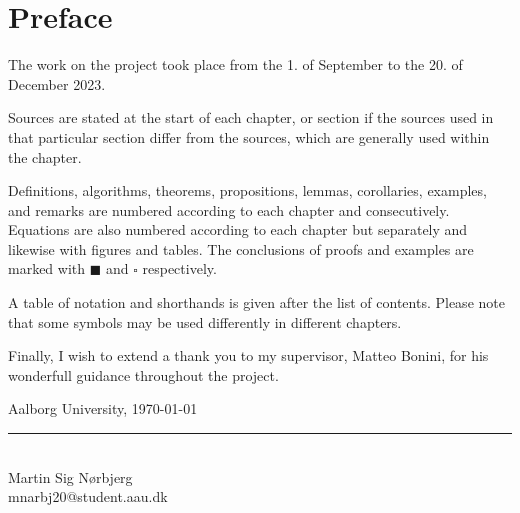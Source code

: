 \chapter*{Preface}


The work on the project took place from the 1. of September to the 20. of December 2023.

Sources are stated at the start of each chapter, or section if the sources used in that particular section differ from the sources, which are generally used within the chapter.

Definitions, algorithms, theorems, propositions, lemmas, corollaries, examples, and remarks are numbered according to each chapter and consecutively.
Equations are also numbered according to each chapter but separately and likewise with figures and tables.
The conclusions of proofs and examples are marked with $\blacksquare$ and $\square$ respectively.

A table of notation and shorthands is given after the list of contents.
Please note that some symbols may be used differently in different chapters.

Finally, I wish to extend a thank you to my supervisor, Matteo Bonini, for his wonderfull guidance throughout the project.

\vspace{\baselineskip}\hfill Aalborg University, \today
\vfill\noindent

\begin{minipage}[H]{\textwidth}
 \centering
 \rule{\textwidth / 2}{1pt}\\
  Martin Sig Nørbjerg\\
 {\footnotesize mnarbj20@student.aau.dk}
\end{minipage}
\hfill
